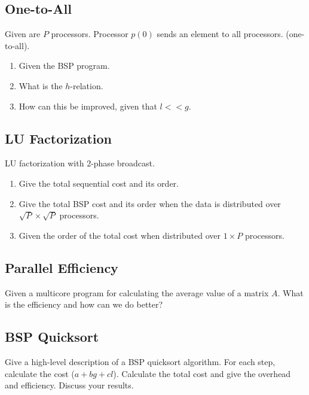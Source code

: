 \documentclass[../main.tex]{subfiles}
\begin{document}
\subsection{One-to-All}
\begin{question}
Given are $P$ processors. Processor $p(0)$ sends an element to all processors. (one-to-all).
\begin{enumerate}
	\item Given the BSP program.
	\item What is the $h$-relation.
	\item How can this be improved, given that $l << g$.
\end{enumerate}
\end{question}
\begin{solution}
\end{solution}

\subsection{LU Factorization}
\begin{question}
LU factorization with 2-phase broadcast.
\begin{enumerate}
	\item Give the total sequential cost and its order.
	\item Give the total BSP cost and its order when the data is distributed over $\sqrt{P} \times \sqrt{P}$ processors.
	\item Given the order of the total cost when distributed over $1 \times P$ processors.
\end{enumerate}
\end{question}
\begin{solution}
\end{solution}

\subsection{Parallel Efficiency}
\begin{question}
Given a multicore program for calculating the average value of a matrix $A$. What is the efficiency and how can we do better?
\end{question}
\begin{solution}
\end{solution}

\subsection{BSP Quicksort}
\begin{question}
Give a high-level description of a BSP quicksort algorithm. For each step, calculate the cost ($a + bg + cl$). Calculate the total cost and give the overhead and efficiency. Discuss your results.
\end{question}
\begin{solution}
\end{solution}
\end{document}

